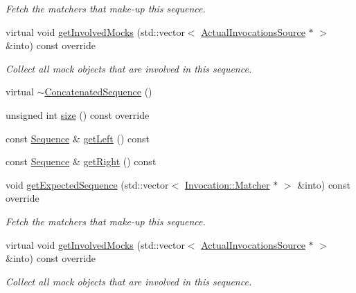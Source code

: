 \begin{DoxyCompactItemize}
\begin{DoxyCompactList}\small\item\em Fetch the matchers that make-\/up this sequence. \end{DoxyCompactList}\item 
virtual void \mbox{\hyperlink{classfakeit_1_1ConcatenatedSequence_a3b475e68ab4f750f2d4946e4777ebe30}{get\+Involved\+Mocks}} (std\+::vector$<$ \mbox{\hyperlink{structfakeit_1_1ActualInvocationsSource}{Actual\+Invocations\+Source}} $\ast$ $>$ \&into) const override
\begin{DoxyCompactList}\small\item\em Collect all mock objects that are involved in this sequence. \end{DoxyCompactList}\item 
virtual \mbox{\hyperlink{classfakeit_1_1ConcatenatedSequence_a22346ae8c3c2af91f26144338750be25}{$\sim$\+Concatenated\+Sequence}} ()
\item 
unsigned int \mbox{\hyperlink{classfakeit_1_1ConcatenatedSequence_aa1dba1b0274b30626ceab3a743c8105a}{size}} () const override
\item 
const \mbox{\hyperlink{classfakeit_1_1Sequence}{Sequence}} \& \mbox{\hyperlink{classfakeit_1_1ConcatenatedSequence_aee102fbcc892783441a36082e1a22789}{get\+Left}} () const
\item 
const \mbox{\hyperlink{classfakeit_1_1Sequence}{Sequence}} \& \mbox{\hyperlink{classfakeit_1_1ConcatenatedSequence_a7b1ed9161c972e43fdf2e4cfecbe5bd7}{get\+Right}} () const
\item 
void \mbox{\hyperlink{classfakeit_1_1ConcatenatedSequence_a176b1d4dac2e552f646c2c3ce98f0d1f}{get\+Expected\+Sequence}} (std\+::vector$<$ \mbox{\hyperlink{structfakeit_1_1Invocation_1_1Matcher}{Invocation\+::\+Matcher}} $\ast$ $>$ \&into) const override
\begin{DoxyCompactList}\small\item\em Fetch the matchers that make-\/up this sequence. \end{DoxyCompactList}\item 
virtual void \mbox{\hyperlink{classfakeit_1_1ConcatenatedSequence_a3b475e68ab4f750f2d4946e4777ebe30}{get\+Involved\+Mocks}} (std\+::vector$<$ \mbox{\hyperlink{structfakeit_1_1ActualInvocationsSource}{Actual\+Invocations\+Source}} $\ast$ $>$ \&into) const override
\begin{DoxyCompactList}\small\item\em Collect all mock objects that are involved in this sequence. \end{DoxyCompactList}\item 

\end{DoxyCompactItemize}
